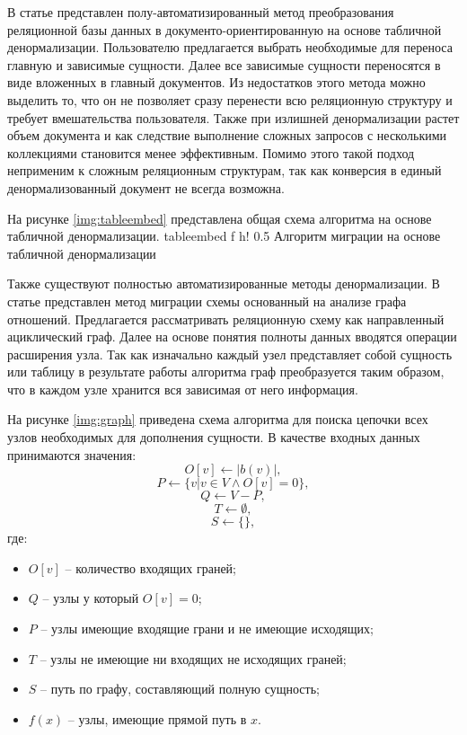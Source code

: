 В статье \cite{embedding} представлен полу-автоматизированный метод преобразования реляционной базы данных в документо-ориентированную на основе табличной денормализации.
Пользователю предлагается выбрать необходимые для переноса главную и зависимые сущности. 
Далее все зависимые сущности переносятся в виде вложенных в главный документов.
Из недостатков этого метода можно выделить то, что он не позволяет сразу перенести всю реляционную структуру и требует вмешательства пользователя.
Также при излишней денормализации растет объем документа и как следствие выполнение сложных запросов с несколькими коллекциями становится менее эффективным.
Помимо этого такой подход неприменим к сложным реляционным структурам, так как конверсия в единый денормализованный документ не всегда возможна.

\clearpage

На рисунке \ref{img:tableembed} представлена общая схема алгоритма на основе табличной денормализации.
    {tableembed} %
    {f} %
    {h!} %
    {0.5\textwidth} %
    {Алгоритм миграции на основе табличной денормализации} %

\clearpage

Также существуют полностью автоматизированные методы денормализации.
В статье \cite{graphmethod} представлен метод миграции схемы основанный на анализе графа отношений.
Предлагается рассматривать реляционную схему как направленный ациклический граф.
Далее на основе понятия полноты данных вводятся операции расширения узла.
Так как изначально каждый узел представляет собой сущность или таблицу в результате работы алгоритма граф преобразуется таким образом, что в каждом узле хранится вся зависимая от него информация.

На рисунке \ref{img:graph} приведена схема алгоритма для поиска цепочки всех узлов необходимых для дополнения сущности.
В качестве входных данных принимаются значения:
$$O[v] \leftarrow |b(v)|,$$
$$P \leftarrow  \{v | v \in V \wedge O[v] = 0\},$$
$$Q \leftarrow V - P,$$
$$T \leftarrow \emptyset,$$
$$ S \leftarrow \{\},$$
где:
\begin{itemize}[label=---]
    \item $O[v]$ -- количество входящих граней;
    \item $Q$ -- узлы у который $O[v] = 0$;
    \item $P$ -- узлы имеющие входящие грани и не имеющие исходящих;
    \item $T$ -- узлы не имеющие ни входящих не исходящих граней;
    \item $S$ -- путь по графу, составляющий полную сущность;
    \item $f(x)$ -- узлы, имеющие прямой путь в $x$.
\end{itemize}

